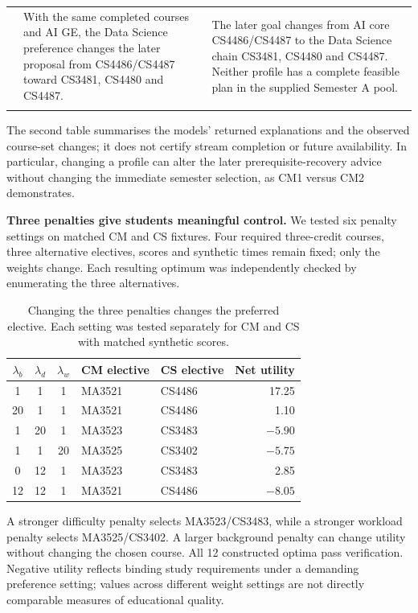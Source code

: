 \documentclass{article}
\begin{document}
{\begin{longtable}{p{1.05in}p{2.05in}p{2.05in}}
\addlinespace[5pt]
{\raggedright Explicit CS stream: CS1 versus CS3\par} & {\raggedright With the same completed courses and AI GE, the Data Science preference changes the later proposal from CS4486/CS4487 toward CS3481, CS4480 and CS4487.\par} & {\raggedright The later goal changes from AI core CS4486/CS4487 to the Data Science chain CS3481, CS4480 and CS4487. Neither profile has a complete feasible plan in the supplied Semester A pool.\par}\\
\addlinespace[5pt]
\end{longtable}
}

The second table summarises the models' returned explanations and the observed course-set changes; it does not certify stream completion or future availability. In particular, changing a profile can alter the later prerequisite-recovery advice without changing the immediate semester selection, as CM1 versus CM2 demonstrates.

\textbf{Three penalties give students meaningful control.} We tested six penalty settings on matched CM and CS fixtures. Four required three-credit courses, three alternative electives, scores and synthetic times remain fixed; only the weights change. Each resulting optimum was independently checked by enumerating the three alternatives.

\begin{table}[H]
\centering\small
\caption{Changing the three penalties changes the preferred elective. Each setting was tested separately for CM and CS with matched synthetic scores.}
\begin{tabular}{cccp{1.05in}p{1.05in}r}
\toprule
$\lambda_b$ & $\lambda_d$ & $\lambda_w$ & CM elective & CS elective & Net utility\\
\midrule
1 & 1 & 1 & MA3521 & CS4486 & 17.25\\
20 & 1 & 1 & MA3521 & CS4486 & 1.10\\
1 & 20 & 1 & MA3523 & CS3483 & $-5.90$\\
1 & 1 & 20 & MA3525 & CS3402 & $-5.75$\\
0 & 12 & 1 & MA3523 & CS3483 & 2.85\\
12 & 12 & 1 & MA3521 & CS4486 & $-8.05$\\
\bottomrule
\end{tabular}
\label{tab:lambda}
\end{table}

A stronger difficulty penalty selects MA3523/CS3483, while a stronger workload penalty selects MA3525/CS3402. A larger background penalty can change utility without changing the chosen course. All 12 constructed optima pass verification. Negative utility reflects binding study requirements under a demanding preference setting; values across different weight settings are not directly comparable measures of educational quality.
\end{document}
